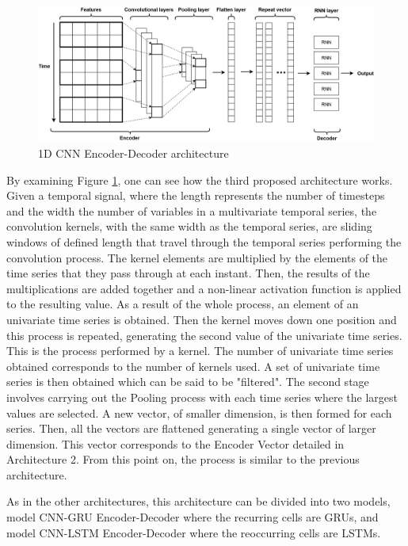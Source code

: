 \begin{figure}[h!]
    \centering
    \begin{center}
    \includegraphics[width=1\textwidth]{Images/ED.png}
    \caption{1D CNN Encoder-Decoder architecture}
    \label{arc3}
    \end{center}
\end{figure}

By examining Figure \ref{arc3}, one can see how the third proposed architecture works. Given a temporal signal, where the length represents the number of timesteps and the width the number of variables in a multivariate temporal series, the convolution kernels, with the same width as the temporal series, are sliding windows of defined length that travel through the temporal series performing the convolution process. The kernel elements are multiplied by the elements of the time series that they pass through at each instant. Then, the results of the multiplications are added together and a non-linear activation function is applied to the resulting value. As a result of the whole process, an element of an univariate time series is obtained. Then the kernel moves down one position and this process is repeated, generating the second value of the univariate time series. This is the process performed by a kernel. The number of univariate time series obtained corresponds to the number of kernels used. A set of univariate time series is then obtained which can be said to be "filtered". The second stage involves carrying out the Pooling process with each time series where the largest values are selected. A new vector, of smaller dimension, is then formed for each series. Then, all the vectors are flattened generating a single vector of larger dimension. This vector corresponds to the Encoder Vector detailed in Architecture 2. From this point on, the process is similar to the previous architecture. 

As in the other architectures, this architecture can be divided into two models, model \ac{CNN}-\ac{GRU} Encoder-Decoder where the recurring cells are \ac{GRU}s, and model \ac{CNN}-\ac{LSTM} Encoder-Decoder where the reoccurring cells are \ac{LSTM}s.  



